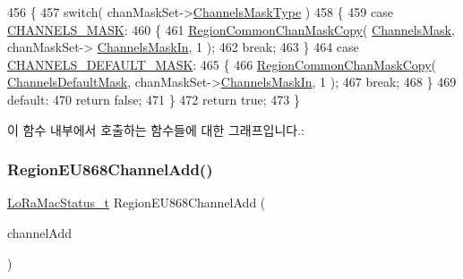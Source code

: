 \begin{DoxyCode}
456 \{
457     \textcolor{keywordflow}{switch}( chanMaskSet->\mbox{\hyperlink{structs_chan_mask_set_params_a02b75be74cbc34fa2126b2c250ea9283}{ChannelsMaskType}} )
458     \{
459         \textcolor{keywordflow}{case} \mbox{\hyperlink{group___r_e_g_i_o_n_gga7a62e669f567fc160ad58210664bca9ca1e68275c0b16a0c4935eada4315dd089}{CHANNELS\_MASK}}:
460         \{
461             \mbox{\hyperlink{group___r_e_g_i_o_n_c_o_m_m_o_n_ga95f5199d490113269fae7f2e0569e9a0}{RegionCommonChanMaskCopy}}( \mbox{\hyperlink{_region_e_u868_8c_a2188957b5ca6af8092154d7ccbfa5757}{ChannelsMask}}, chanMaskSet->
      \mbox{\hyperlink{structs_chan_mask_set_params_ade387d6ecaf27781b14ad97ebdfc0695}{ChannelsMaskIn}}, 1 );
462             \textcolor{keywordflow}{break};
463         \}
464         \textcolor{keywordflow}{case} \mbox{\hyperlink{group___r_e_g_i_o_n_gga7a62e669f567fc160ad58210664bca9ca9bbb18c8600ad8781ba04a2cb121ea60}{CHANNELS\_DEFAULT\_MASK}}:
465         \{
466             \mbox{\hyperlink{group___r_e_g_i_o_n_c_o_m_m_o_n_ga95f5199d490113269fae7f2e0569e9a0}{RegionCommonChanMaskCopy}}( 
      \mbox{\hyperlink{_region_e_u868_8c_ac127b19779301713d5ed92eb03366a2d}{ChannelsDefaultMask}}, chanMaskSet->\mbox{\hyperlink{structs_chan_mask_set_params_ade387d6ecaf27781b14ad97ebdfc0695}{ChannelsMaskIn}}, 1 );
467             \textcolor{keywordflow}{break};
468         \}
469         \textcolor{keywordflow}{default}:
470             \textcolor{keywordflow}{return} \textcolor{keyword}{false};
471     \}
472     \textcolor{keywordflow}{return} \textcolor{keyword}{true};
473 \}
\end{DoxyCode}
이 함수 내부에서 호출하는 함수들에 대한 그래프입니다.\+:
\mbox{\label{group___r_e_g_i_o_n_e_u868_gaa51182eab8774612408fd0ea8f89f63b}} 
\subsubsection{\texorpdfstring{Region\+E\+U868\+Channel\+Add()}{RegionEU868ChannelAdd()}}
{\footnotesize\ttfamily \mbox{\hyperlink{group___l_o_r_a_m_a_c_ga30bd25657e10480f8605ee951b0ecfbd}{Lo\+Ra\+Mac\+Status\+\_\+t}} Region\+E\+U868\+Channel\+Add (\begin{DoxyParamCaption}\item[{\mbox{\hyperlink{group___r_e_g_i_o_n_gab1c5f3aa06614283202906cef4417860}{Channel\+Add\+Params\+\_\+t}} $\ast$}]{channel\+Add }\end{DoxyParamCaption})}



